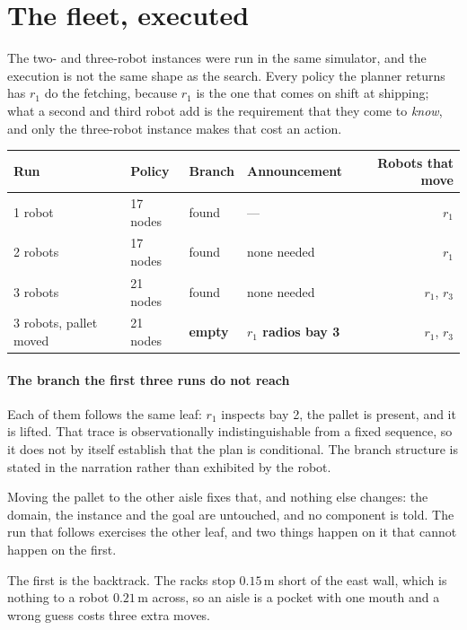 \documentclass[11pt,a4paper]{article}
\theoremstyle{definition}
\begin{document}
\section{The fleet, executed}

The two- and three-robot instances were run in the same simulator, and the
execution is not the same shape as the search. Every policy the planner returns
has $r_1$ do the fetching, because $r_1$ is the one that comes on shift at
shipping; what a second and third robot add is the requirement that they come
to \emph{know}, and only the three-robot instance makes that cost an action.

\begin{center}
\begin{tabular}{@{}llllr@{}}
\toprule
Run & Policy & Branch & Announcement & Robots that move \\
\midrule
1 robot & 17 nodes & found & --- & $r_1$ \\
2 robots & 17 nodes & found & none needed & $r_1$ \\
3 robots & 21 nodes & found & none needed & $r_1$, $r_3$ \\
3 robots, pallet moved & 21 nodes & \textbf{empty} & \textbf{$r_1$ radios bay 3} & $r_1$, $r_3$ \\
\bottomrule
\end{tabular}
\end{center}

\paragraph{The branch the first three runs do not reach} Each of them follows
the same leaf: $r_1$ inspects bay 2, the pallet is present, and it is lifted.
That trace is observationally indistinguishable from a fixed sequence, so it
does not by itself establish that the plan is conditional. The branch structure
is stated in the narration rather than exhibited by the robot.

Moving the pallet to the other aisle fixes that, and nothing else changes: the
domain, the instance and the goal are untouched, and no component is told. The
run that follows exercises the other leaf, and two things happen on it that
cannot happen on the first.

The first is the backtrack. The racks stop $0.15$\,m short of the east wall,
which is nothing to a robot $0.21$\,m across, so an aisle is a pocket with one
mouth and a wrong guess costs three extra moves.
\end{document}
